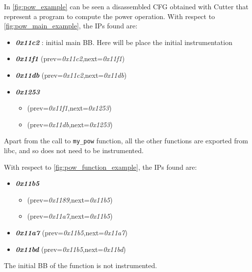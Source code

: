 In \cref{fig:pow_example} can be seen a disassembled \gls{CFG} obtained with Cutter \cite{cutter} that represent a program to compute the power operation.
With respect to \cref{fig:pow_main_example}, the \gls{IP}s found are: 
\begin{itemize}
    \item \textbf{\textit{0x11c2}} : initial main \gls{BB}. Here will be place the initial instrumentation
    \item \textbf{\textit{0x11f1}} (prev=\textit{0x11c2},next=\textit{0x11f1}) 
    \item \textbf{\textit{0x11db}} (prev=\textit{0x11c2},next=\textit{0x11db}) 
    \item \textbf{\textit{0x1253}} 
        \begin{itemize}
            \item (prev=\textit{0x11f1},next=\textit{0x1253})
            \item (prev=\textit{0x11db},next=\textit{0x1253}) 
        \end{itemize} 
    
\end{itemize}
Apart from the call to \texttt{my\_pow} function, all the other functions are exported from libc, and so does not 
need to be instrumented.

With respect to \cref{fig:pow_function_example}, the \gls{IP}s found are:
\begin{itemize}
    \item \textbf{\textit{0x11b5}} 
        \begin{itemize}
            \item (prev=\textit{0x1189},next=\textit{0x11b5}) 
            \item (prev=\textit{0x11a7},next=\textit{0x11b5}) 
        \end{itemize}
    \item \textbf{\textit{0x11a7}} (prev=\textit{0x11b5},next=\textit{0x11a7}) 
    \item \textbf{\textit{0x11bd}} (prev=\textit{0x11b5},next=\textit{0x11bd}) 
\end{itemize}
The initial \gls{BB} of the function is not instrumented.